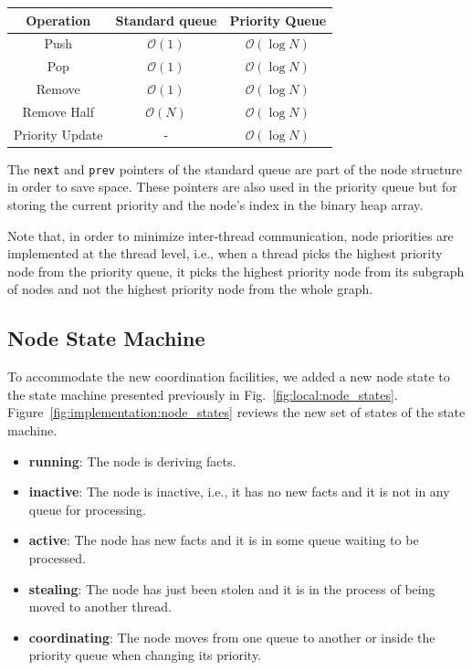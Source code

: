\begin{table}[h]
   \begin{tabular}{| c | c | c |}
      \hline
      \textbf{Operation} & \textbf{Standard queue} & \textbf{Priority Queue} \\
      \hline
      Push & $\mathcal{O}(1)$ & $\mathcal{O}(\log{N})$ \\ \hline
      Pop & $\mathcal{O}(1)$ & $\mathcal{O}(\log{N})$ \\ \hline
      Remove & $\mathcal{O}(1)$ & $\mathcal{O}(\log{N})$ \\ \hline
      Remove Half & $\mathcal{O}(N)$ & $\mathcal{O}(\log{N})$ \\ \hline
      Priority Update & - & $\mathcal{O}(\log{N})$ \\ \hline
   \end{tabular}
   \label{fig:implementation:table_queue}
\end{table}

The \texttt{next} and \texttt{prev} pointers of the standard queue are part of
the node structure in order to save space. These pointers are also used in the
priority queue but for storing the current priority and the node's index in the binary
heap array. 

Note that, in order to minimize inter-thread communication, node priorities are
implemented at the thread level, i.e., when a thread picks the highest priority
node from the priority queue, it picks the highest priority node from its
subgraph of nodes and not the highest priority node from the whole graph.

\subsection{Node State Machine}\label{sec:node_state_machine}

To accommodate the new coordination facilities, we added a new node state to the
state machine presented previously in Fig.~\ref{fig:local:node_states}.
Figure~\ref{fig:implementation:node_states} reviews the new set of states of
the state machine.

\begin{itemize}
   \item \textbf{running}: The node is deriving facts.
   \item \textbf{inactive}: The node is inactive, i.e., it has no new facts and
      it is not in any
   queue for processing.
   \item \textbf{active}: The node has new facts and it is in some queue waiting
   to be processed.
   \item \textbf{stealing}: The node has just been stolen and it is in the process of being
   moved to another thread.
   \item \textbf{coordinating}: The node moves from one queue to another or
      inside the priority queue when changing its priority.
\end{itemize}

